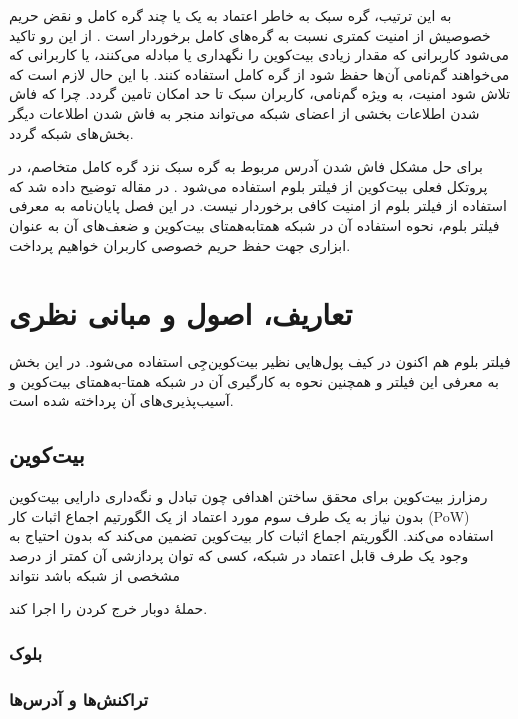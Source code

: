 به این ترتیب،‌ گره سبک به خاطر اعتماد به یک یا چند گره کامل و نقض حریم خصوصیش از امنیت کمتری نسبت به گره‌های کامل برخوردار است \cite{Sompolinsky2016}. از این رو تاکید می‌شود کاربرانی که مقدار زیادی بیت‌کوین را نگهداری یا مبادله می‌کنند، یا کاربرانی که می‌خواهند گم‌نامی آن‌ها حفظ شود از گره‌ کامل استفاده کنند. با این حال لازم است که تلاش شود امنیت، به ویژه گم‌نامی، کاربران سبک تا حد امکان تامین گردد. چرا که فاش شدن اطلاعات بخشی از اعضای شبکه می‌تواند منجر به فاش شدن اطلاعات دیگر بخش‌های شبکه گردد.

برای حل مشکل فاش شدن آدرس مربوط به گره سبک نزد گره کامل متخاصم، در پروتکل فعلی بیت‌کوین از فیلتر بلوم استفاده می‌شود \cite{Hearn2013}. در مقاله \cite{Gervais2014} توضیح داده ‌شد که استفاده از فیلتر بلوم از امنیت کافی برخوردار نیست. در این فصل پایان‌نامه به معرفی فیلتر بلوم، نحوه استفاده آن در شبکه همتا‌به‌همتای بیت‌کوین و ضعف‌های آن به عنوان ابزاری جهت حفظ حریم خصوصی کاربران خواهیم پرداخت.

\section{تعاریف، اصول و مبانی نظری}



فیلتر بلوم هم اکنون در کیف پول‌هایی نظیر بیت‌کوین‌جِی \cite{bitcoinj} استفاده می‌شود. در این بخش به معرفی این فیلتر و همچنین نحوه به کارگیری آن در شبکه همتا-به‌همتای بیت‌کوین و آسیب‌پذیری‌های آن پرداخته شده است.

\subsection{بیت‌کوین}

رمزارز بیت‌کوین برای محقق ساختن اهدافی چون تبادل و نگه‌داری دارایی بیت‌کوین بدون نیاز به یک طرف سوم مورد اعتماد از یک الگورتیم اجماع اثبات کار
(PoW)
استفاده می‌کند\cite{Nakamoto2009}. الگوریتم اجماع اثبات کار بیت‌کوین تضمین می‌کند که بدون احتیاج به  وجود یک طرف قابل اعتماد در شبکه، کسی که توان پردازشی آن کمتر از درصد مشخصی از شبکه باشد نتواند 

حملهٔ دوبار خرج کردن
را اجرا کند.

\subsubsection{بلوک}

\subsubsection{تراکنش‌ها و آدرس‌ها‌}

